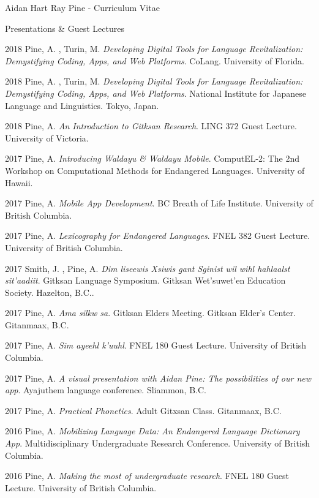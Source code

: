 \documentclass[12pt]{letter}
\begin{document}
\begin{cv}{ Aidan Hart Ray Pine  \space - \space   Curriculum Vitae}
\begin{cvlist}{Presentations \& Guest Lectures}
                    \item[2018]  Pine,  A. ,  Turin,  M.   \textit{Developing Digital Tools for Language Revitalization: Demystifying Coding, Apps, and Web Platforms}. CoLang. University of Florida.  
                    \item[2018]  Pine,  A. ,  Turin,  M.   \textit{Developing Digital Tools for Language Revitalization: Demystifying Coding, Apps, and Web Platforms}. National Institute for Japanese Language and Linguistics. Tokyo, Japan.  
                    \item[2018]  Pine,  A.   \textit{An Introduction to Gitksan Research}. LING 372 Guest Lecture. University of Victoria.  
                    \item[2017]  Pine,  A.   \textit{Introducing Waldayu \& Waldayu Mobile}. ComputEL-2: The 2nd Workshop on Computational Methods for Endangered Languages. University of Hawaii.  
                    \item[2017]  Pine,  A.   \textit{Mobile App Development}. BC Breath of Life Institute. University of British Columbia.  
                    \item[2017]  Pine,  A.   \textit{Lexicography for Endangered Languages}. FNEL 382 Guest Lecture. University of British Columbia.  
                    \item[2017]  Smith,  J. ,  Pine,  A.   \textit{Dim liseewis Xsiwis g̲ant Sginist wil wihl hahlaalst sit'aadiit}. Gitksan Language Symposium. Gitksan Wet'suwet'en Education Society. Hazelton, B.C..  
                    \item[2017]  Pine,  A.   \textit{Ama silkw sa}. Gitksan Elders Meeting. Gitksan Elder's Center. Gitanmaax, B.C.  
                    \item[2017]  Pine,  A.   \textit{Sim ayeehl k'uuhl}. FNEL 180 Guest Lecture. University of British Columbia.  
                    \item[2017]  Pine,  A.   \textit{A visual presentation with Aidan Pine: The possibilities of our new app}. Ayajuthem language conference. Sliammon, B.C.  
                    \item[2017]  Pine,  A.   \textit{Practical Phonetics}. Adult Gitxsan Class. Gitanmaax, B.C.  
                    \item[2016]  Pine,  A.   \textit{Mobilizing Language Data: An Endangered Language Dictionary App}. Multidisciplinary Undergraduate Research Conference. University of British Columbia.  
                    \item[2016]  Pine,  A.   \textit{Making the most of undergraduate research}. FNEL 180 Guest Lecture. University of British Columbia.  

\end{cvlist}
\end{cv}
\end{document}
